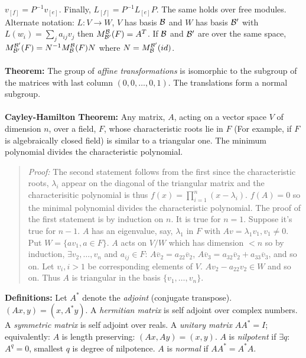 $v_{[f]}= P^{-1}v_{[e]}$.  Finally, $L_{[f]}= P^{-1} L_{[e]}P$.  The same holds over free
modules.  Alternate notation: $L: V \rightarrow W$, 
$V$ has basis ${\cal B}$ and
$W$ has basis ${\cal B'}$ with $L(w_i)= \sum_j a_{ij} v_j$ then
$M^{\cal B}_{\cal B'}(F)= A^T$.  If ${\cal B}$ and ${\cal B'}$ are over
the same space, 
$M^{\cal B'}_{\cal B'}(F)=
N^{-1}M^{\cal B}_{\cal B}(F)N$ where
$N= M^{\cal B'}_{\cal B}(id)$.
\\
\\
{\bf Theorem:}
The group of \emph{affine transformations} is isomorphic
to the subgroup of the matrices with last column $(0,0, \ldots, 0,1)$.
The translations form a normal subgroup.
\\
\\
{\bf Cayley-Hamilton Theorem:}  
Any matrix, $A$,
acting on a vector space $V$ of dimension $n$, over a field, $F$, whose 
characteristic roots lie in $F$ (For example, if $F$ is
algebraically closed field) is similar to a 
triangular one.  The minimum polynomial divides the characteristic polynomial.
\begin{quote}
\emph{Proof:}
The second statement follows from the first since the characteristic roots, $\lambda_i$
appear on the diagonal of the triangular matrix and the characterisitic polynomial is
thus $f(x)= \prod_{i=1}^n (x-\lambda_i)$.  $f(A)=0$ so the minimal polynomial divides the
characteristic polynomial.  The proof of the first statement is by induction on $n$.  It is
true for $n=1$.  Suppose it's true for $n-1$.  $A$ has an eigenvalue, say, $\lambda_1$ in
$F$ with $Av= \lambda_1 v_1, v_1 \ne 0$.  Put $W= \{ av_1, a \in F \}$. $A$ acts on
$V/W$ which has dimension $<n$ so by induction, $\exists v_2 , \ldots , v_n$ and
$a_{ij} \in F$: 
$A {\overline v}_2= a_{22} {\overline v}_2$,
$A {\overline v}_3= 
a_{32} {\overline v}_2 +
a_{33} {\overline v}_3$,
and so on.  Let $v_i, i>1$ be corresponding elements of $V$.  $Av_2-a_{22}v_2 \in W$ and
so on.  Thus $A$ is triangular in the basis $\{ v_1, \ldots, v_n \}$.
\end{quote}
{\bf Definitions:} Let $A^*$ denote the \emph{adjoint} (conjugate transpose).  
$(Ax,y)=(x,A^*y)$.
A \emph{hermitian matrix} is self adjoint over complex numbers.
A \emph{symmetric matrix} is self adjoint over reals.  
A \emph{unitary matrix} $AA^*=I$; equivalently: $A$ is length
preserving: $(Ax,Ay)=(x,y)$.  
$A$ is \emph{nilpotent} if $\exists q$: $A^q = 0$, smallest $q$ is degree of nilpotence.
$A$ is \emph{normal} if $A A^*= A^* A$.
\\
\\
